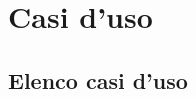 \documentclass[a4paper, oneside, dvipsnames, table]{article}
\begin{document}
\copertina{}
\newpage



\fancyAR{}

\clearpage
\tableofcontents
\clearpage

\section{Casi d'uso}

\clearpage
\subsection{Elenco casi d'uso}
\setcounter{secnumdepth}{0}

\end{document}
